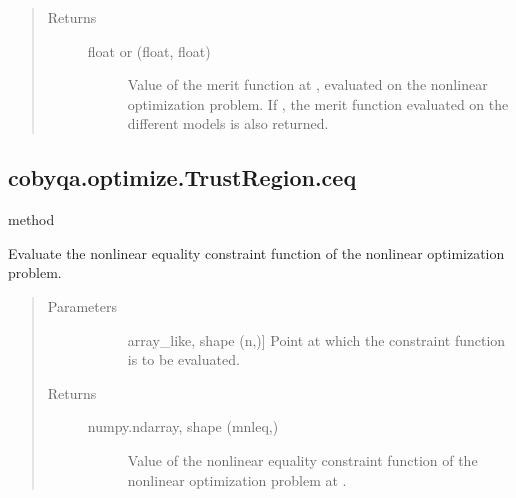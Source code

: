 \documentclass[letterpaper,10pt,english]{sphinxmanual}
\begin{document}
\begin{fulllineitems}
\begin{fulllineitems}
\begin{quote}
\begin{description}
\begin{description}
\end{description}

\item[{Returns}] \leavevmode\begin{description}
\item[{float or (float, float)}] \leavevmode
\sphinxAtStartPar
Value of the merit function at , evaluated on the nonlinear
optimization problem. If , the merit function
evaluated on the different models is also returned.

\end{description}

\end{description}\end{quote}

\end{fulllineitems}



\subsection{cobyqa.optimize.TrustRegion.ceq}
\label{\detokenize{refs/generated/cobyqa.optimize.TrustRegion.ceq:cobyqa-optimize-trustregion-ceq}}\label{\detokenize{refs/generated/cobyqa.optimize.TrustRegion.ceq::doc}}
\sphinxAtStartPar
method

\begin{fulllineitems}
\label{\detokenize{refs/generated/cobyqa.optimize.TrustRegion.ceq:cobyqa.optimize.TrustRegion.ceq}}
\sphinxAtStartPar
Evaluate the nonlinear equality constraint function of the nonlinear
optimization problem.
\begin{quote}\begin{description}
\item[{Parameters}] \leavevmode\begin{description}
\item[{}] \leavevmode{[}array\_like, shape (n,){]}
\sphinxAtStartPar
Point at which the constraint function is to be evaluated.

\end{description}

\item[{Returns}] \leavevmode\begin{description}
\item[{numpy.ndarray, shape (mnleq,)}] \leavevmode
\sphinxAtStartPar
Value of the nonlinear equality constraint function of the
nonlinear optimization problem at .


\end{description}
\end{description}
\end{quote}
\end{fulllineitems}
\end{fulllineitems}
\end{document}
